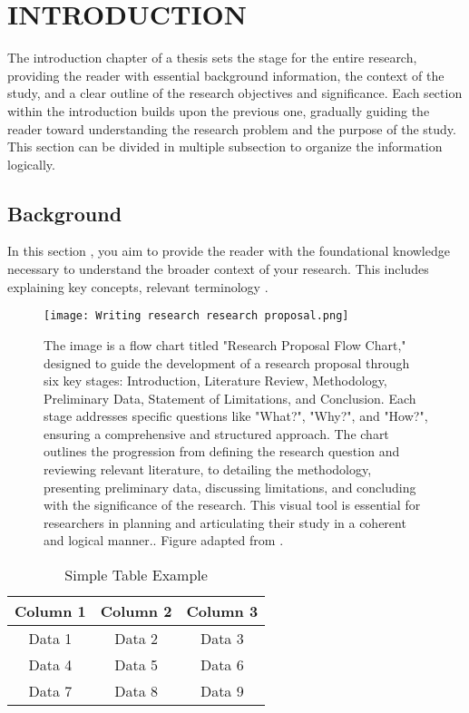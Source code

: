 \chapter{INTRODUCTION}



The introduction chapter of a thesis sets the stage for the entire research, providing the reader with essential background information, the context of the study, and a clear outline of the research objectives and significance. Each section within the introduction builds upon the previous one, gradually guiding the reader toward understanding the research problem and the purpose of the study. This section can be divided in multiple subsection to organize the information logically.

\section{Background}

In this section \parencite{Lal_2005as, Vassalli2009}, you aim to provide the reader with the foundational knowledge necessary to understand the broader context of your research. This includes explaining key concepts, relevant terminology  \parencite{Amso_2015}.


\begin{figure}
	\centering
	\texttt{[image: Writing research research proposal.png]}
	\caption[Research Proposal Flow Chart]
	{The image is a flow chart titled "Research Proposal Flow Chart," designed to guide the development of a research proposal through six key stages: Introduction, Literature Review, Methodology, Preliminary Data, Statement of Limitations, and Conclusion. Each stage addresses specific questions like "What?", "Why?", and "How?", ensuring a comprehensive and structured approach. The chart outlines the progression from defining the research question and reviewing relevant literature, to detailing the methodology, presenting preliminary data, discussing limitations, and concluding with the significance of the research. This visual tool is essential for researchers in planning and articulating their study in a coherent and logical manner.. Figure adapted from \cite{Dorsett2010}.}
	\label{fig:ExxonSpreading}
\end{figure}
%

\begin{table}[h]
    \centering
    \begin{tabular}{|c|c|c|}
        \hline
        \textbf{Column 1} & \textbf{Column 2} & \textbf{Column 3} \\
        \hline
        Data 1 & Data 2 & Data 3 \\
        Data 4 & Data 5 & Data 6 \\
        Data 7 & Data 8 & Data 9 \\
        \hline
    \end{tabular}
    \caption{Simple Table Example}
    \label{tab:simple_table}
\end{table}
